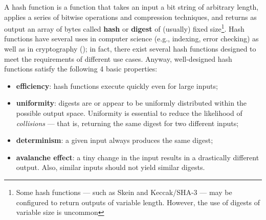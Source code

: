 A hash function is a function that takes an input a bit string of arbitrary length, applies a series of bitwise operations and compression techniques, and returns as output an array of bytes called \textbf{hash} or \textbf{digest} of (usually) fixed size\footnote{Some hash functions --- such as Skein and Keccak/SHA-3 --- may be configured to return outputs of variable length. However, the use of digests of variable size is uncommon}. Hash functions have several uses in computer science (e.g., indexing, error checking) as well as in cryptography (); in fact, there exist several hash functions designed to meet the requirements of different use cases. Anyway, well-designed hash functions satisfy the following 4 basic properties:

\begin{itemize}
	\item \textbf{efficiency}: hash functions execute quickly even for large inputs;
	\item \textbf{uniformity}: digests are or appear to be uniformly distributed within the possible output space. Uniformity is essential to reduce the likelihood of \textit{collisions} --- that is, returning the same digest for two different inputs;
	\item \textbf{determinism}: a given input always produces the same digest;
	\item \textbf{avalanche effect}: a tiny change in the input results in a drastically different output. Also, similar inputs should not yield similar digests.
\end{itemize}

